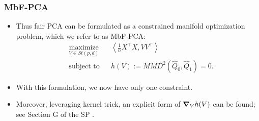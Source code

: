 \documentclass{beamer}
\begin{document}
\begin{frame}
	\frametitle{MbF-PCA}
	\begin{itemize}
		\item Thus fair PCA can be formulated as a constrained manifold optimization problem, which we refer to as MbF-PCA:
		\begin{equation}
			\label{eq:MbF-PCA}
			\begin{aligned}
				& \underset{V \in St(p, d)}{\text{maximize}}
				& &  %
				\left\langle \frac{1}{n} X^\intercal X, V V^\intercal \right\rangle\\
				& \text{subject to}
				& & h(V) := MMD^2(\hat{Q}_0, \hat{Q}_1) = 0.
			\end{aligned}
		\end{equation}
		
		\item With this formulation, we now have only one constraint.
		
		\item Moreover, leveraging kernel trick, an explicit form of $\grad_V h(V)$ can be found; see Section G of the SP \cite{Lee21}.
	\end{itemize}
\end{frame}
\end{document}
